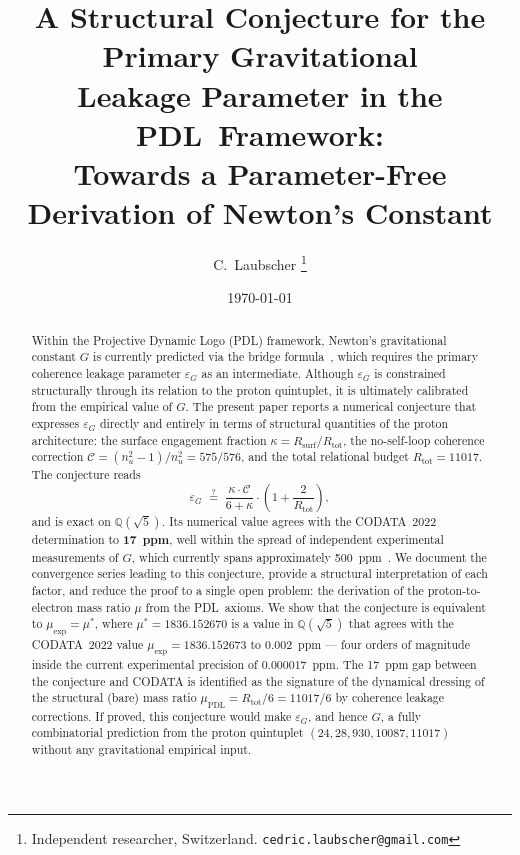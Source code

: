 \documentclass[11pt,a4paper]{article}
\theoremstyle{definition}
\newcommand{\PDL}{\textnormal{PDL}}
\newcommand{\Rsurf}{R_{\mathrm{surf}}}
\newcommand{\Rtot}{R_{\mathrm{tot}}}
\newcommand{\epsg}{\varepsilon_G}
\newcommand{\calC}{\mathcal{C}}
\newcommand{\kap}{\kappa}
\newcommand{\muPDL}{\mu_{\mathrm{PDL}}}
\newcommand{\muexp}{\mu_{\mathrm{exp}}}
\newcommand{\mustar}{\mu^*}
\begin{document}
\title{%
  A Structural Conjecture for the Primary Gravitational\\[4pt]
  Leakage Parameter in the \PDL\ Framework:\\[4pt]
  Towards a Parameter-Free Derivation of Newton's Constant%
}
\author{%
  C.~Laubscher%
  \thanks{Independent researcher, Switzerland. \texttt{cedric.laubscher@gmail.com}}\\[4pt]%
}
\date{\small \today}
\maketitle

\begin{abstract}
Within the Projective Dynamic Logo (\PDL) framework, Newton's gravitational constant $G$ is currently predicted via the bridge formula~\cite{Bridge_PDL_2026}, which requires the primary coherence leakage parameter $\epsg$ as an intermediate. Although $\epsg$ is constrained structurally through its relation to the proton quintuplet, it is ultimately calibrated from the empirical value of $G$. The present paper reports a numerical conjecture that expresses $\epsg$ directly and entirely in terms of structural quantities of the proton architecture: the surface engagement fraction $\kap = \Rsurf/\Rtot$, the no-self-loop coherence correction $\calC = (n_u^2-1)/n_u^2 = 575/576$, and the total relational budget $\Rtot = 11017$. The conjecture reads
\[
\epsg \;\overset{?}{=}\; \frac{\kap\cdot\calC}{6+\kap}\cdot\left(1+\frac{2}{\Rtot}\right),
\]
and is exact on $\mathbb{Q}(\sqrt{5})$. Its numerical value agrees with the CODATA~2022 determination to $\mathbf{17}$~\textbf{ppm}, well within the spread of independent experimental measurements of $G$, which currently spans approximately 500~ppm~\cite{CODATA_2022,Quinn_2013,Rosi_2014,Li_2018,NIST_2024}. We document the convergence series leading to this conjecture, provide a structural interpretation of each factor, and reduce the proof to a single open problem: the derivation of the proton-to-electron mass ratio $\mu$ from the \PDL\ axioms. We show that the conjecture is equivalent to $\muexp = \mustar$, where $\mustar = 1836.152670$ is a value in $\mathbb{Q}(\sqrt{5})$ that agrees with the CODATA~2022 value $\muexp = 1836.152673$ to $0.002$~ppm --- four orders of magnitude inside the current experimental precision of $0.000017$~ppm. The 17~ppm gap between the conjecture and CODATA is identified as the signature of the dynamical dressing of the structural (bare) mass ratio $\muPDL = \Rtot/6 = 11017/6$ by coherence leakage corrections. If proved, this conjecture would make $\epsg$, and hence $G$, a fully combinatorial prediction from the proton quintuplet $(24, 28, 930, 10087, 11017)$ without any gravitational empirical input.
\end{abstract}
\end{document}
